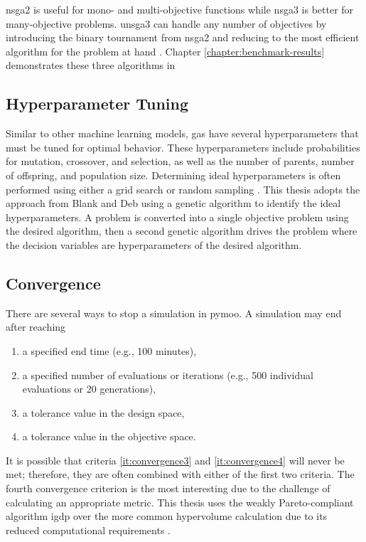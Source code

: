 \ac{nsga2} is useful for mono- and multi-objective functions while \ac{nsga3} is
better for many-objective problems. \ac{unsga3} can handle any number of
objectives by introducing the binary tournament from \ac{nsga2} and reducing to
the most efficient algorithm for the problem at hand \cite{seada_unified_2016}.
Chapter \ref{chapter:benchmark-results} demonstrates these three algorithms in 

\subsection{Hyperparameter Tuning}
Similar to other machine learning models, \acp{ga} have several hyperparameters
that must be tuned for optimal behavior. These hyperparameters include
probabilities for mutation, crossover, and selection, as well as the number of
parents, number of offspring, and population size. Determining ideal
hyperparameters is often performed using either a grid search or random sampling
\cite{bergstra_random_2012}. This thesis adopts the approach from Blank and Deb
\cite{blank_pymoo_2020} using a genetic algorithm to identify the ideal
hyperparameters. A problem is converted into a single objective problem using
the desired algorithm, then a second genetic algorithm drives the problem where
the decision variables are hyperparameters of the desired algorithm.

\subsection{Convergence}
There are several ways to stop a simulation in \ac{pymoo}. A simulation may end
after reaching
\begin{enumerate}
    \item a specified end time (e.g., 100 minutes),
    \label{it:convergence1}
    \item a specified number of evaluations or iterations (e.g., 500 individual
    evaluations or 20 generations),
    \label{it:convergence2}
    \item a tolerance value in the design space,
    \label{it:convergence3}    
    \item a tolerance value in the objective space.
    \label{it:convergence4}
\end{enumerate}

It is possible that criteria \ref{it:convergence3} and \ref{it:convergence4}
will never be met; therefore, they are often combined with either of the first
two criteria. The fourth convergence criterion is the most interesting due to
the challenge of calculating an appropriate metric. This thesis uses the weakly
Pareto-compliant algorithm \ac{igdp} over the more common hypervolume
calculation due to its reduced computational requirements
\cite{ishibuchi_modified_2015}.


